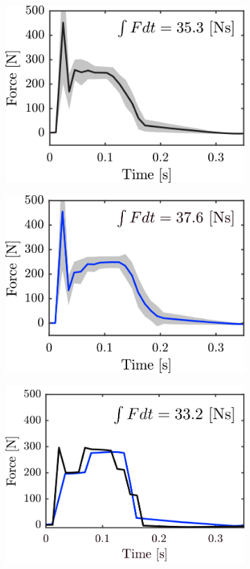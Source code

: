 \begin{figure}
\centering
  \begin{subfigure}{0.32\textwidth}
  \centering
  \includegraphics[width=.9\linewidth]{STYLESTUFF/impulsecompare1.png}
   \caption{}
    \label{fig:imp1}
  \end{subfigure}
    \begin{subfigure}{0.32\textwidth}
  \centering
  \includegraphics[width=.9\linewidth]{STYLESTUFF/impulsecompare2.png}
   \caption{}
    \label{fig:imp2}
  \end{subfigure}
  \begin{subfigure}{0.32\textwidth}
    \centering
  \includegraphics[width=.9\linewidth]{STYLESTUFF/impulsecompare3.png}

\end{subfigure}
\end{figure}

